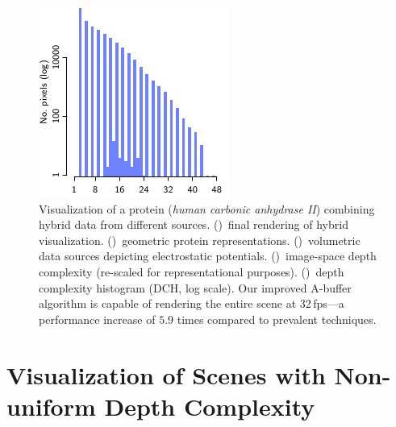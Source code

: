 \documentclass{egpubl}
\newcommand{\ab}{\mbox{A-buffer}}
\newcommand{\dch}{DCH}
\newlength{\boxheight}
\begin{document}
\begin{figure}[tcb]
\begin{minipage}[b][\boxheight][b]{0.24\linewidth}
\begin{minipage}[b]{0.98\linewidth}
      \includegraphics[width=1\linewidth]{figures/plot-dch-mol}\vspace{-2mm}
      \subcaption{\label{fig:sub:protein-dch}%
        \dch{} (log scale)%
      }
    \end{minipage}%
  \end{minipage}%
	\hspace*{\fill}%
  \caption{\label{fig:protein}%
    Visualization of a protein (\emph{human carbonic anhydrase II}) combining hybrid data from different sources.
    ()~final rendering of hybrid visualization.
    ()~geometric protein representations. 
    ()~volumetric data sources depicting electrostatic potentials. 
    ()~image-space depth complexity (re-scaled for representational purposes). 
    ()~depth complexity histogram (DCH, log scale). %
    Our improved \ab{} algorithm is capable of rendering the entire scene at 32\,fps---a performance increase of $5.9$ times compared to prevalent techniques. %
  }
\end{figure}



\section{Visualization of Scenes with Non-uniform Depth Complexity}
\label{sec:depthcomplexity}
\end{document}
